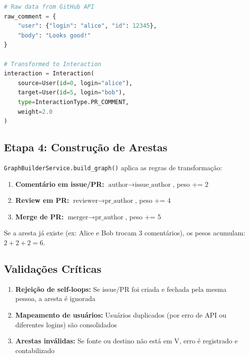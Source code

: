 \documentclass[12pt,a4paper]{article}
\begin{document}
\begin{lstlisting}[language=Python, caption=Exemplo de transformação]
# Raw data from GitHub API
raw_comment = {
    "user": {"login": "alice", "id": 12345},
    "body": "Looks good!"
}

# Transformed to Interaction
interaction = Interaction(
    source=User(id=0, login="alice"),
    target=User(id=5, login="bob"),
    type=InteractionType.PR_COMMENT,
    weight=2.0
)
\end{lstlisting}

\subsection{Etapa 4: Construção de Arestas}

\texttt{GraphBuilderService.build\_graph()} aplica as regras de transformação:

\begin{enumerate}
  \item \textbf{Comentário em issue/PR:} $\text{author} \to \text{issue\_author}$, peso += 2
  \item \textbf{Review em PR:} $\text{reviewer} \to \text{pr\_author}$, peso += 4
  \item \textbf{Merge de PR:} $\text{merger} \to \text{pr\_author}$, peso += 5
\end{enumerate}

Se a aresta já existe (ex: Alice e Bob trocam 3 comentários), os pesos acumulam: $2 + 2 + 2 = 6$.

\subsection{Validações Críticas}

\begin{enumerate}
  \item \textbf{Rejeição de self-loops:} Se issue/PR foi criada e fechada pela mesma pessoa, a aresta é ignorada
  \item \textbf{Mapeamento de usuários:} Usuários duplicados (por erro de API ou diferentes logins) são consolidados
  \item \textbf{Arestas inválidas:} Se fonte ou destino não está em V, erro é registrado e contabilizado
\end{enumerate}

\end{document}
